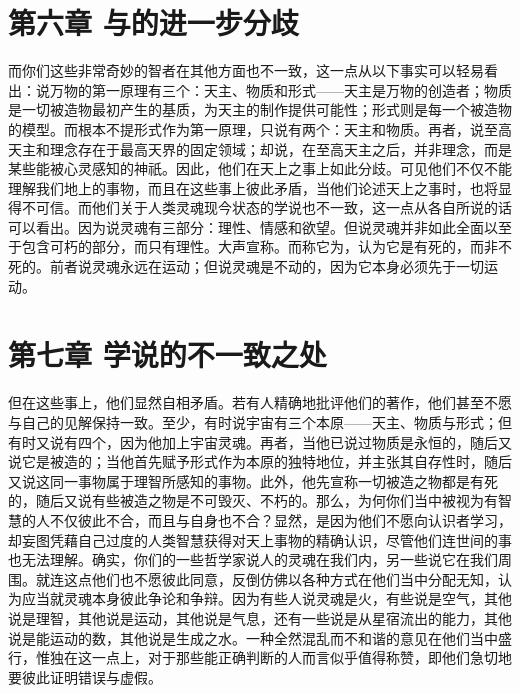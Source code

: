 
\section{第六章 与的进一步分歧}

而你们这些非常奇妙的智者在其他方面也不一致，这一点从以下事实可以轻易看出：说万物的第一原理有三个：天主、物质和形式——天主是万物的创造者；物质是一切被造物最初产生的基质，为天主的制作提供可能性；形式则是每一个被造物的模型。而根本不提形式作为第一原理，只说有两个：天主和物质。再者，说至高天主和理念存在于最高天界的固定领域；却说，在至高天主之后，并非理念，而是某些能被心灵感知的神祇。因此，他们在天上之事上如此分歧。可见他们不仅不能理解我们地上的事物，而且在这些事上彼此矛盾，当他们论述天上之事时，也将显得不可信。而他们关于人类灵魂现今状态的学说也不一致，这一点从各自所说的话可以看出。因为说灵魂有三部分：理性、情感和欲望。但说灵魂并非如此全面以至于包含可朽的部分，而只有理性。大声宣称。而称它为，认为它是有死的，而非不死的。前者说灵魂永远在运动；但说灵魂是不动的，因为它本身必须先于一切运动。\par


\section{第七章 学说的不一致之处}

但在这些事上，他们显然自相矛盾。若有人精确地批评他们的著作，他们甚至不愿与自己的见解保持一致。至少，有时说宇宙有三个本原——天主、物质与形式；但有时又说有四个，因为他加上宇宙灵魂。再者，当他已说过物质是永恒的，随后又说它是被造的；当他首先赋予形式作为本原的独特地位，并主张其自存性时，随后又说这同一事物属于理智所感知的事物。此外，他先宣称一切被造之物都是有死的，随后又说有些被造之物是不可毁灭、不朽的。那么，为何你们当中被视为有智慧的人不仅彼此不合，而且与自身也不合？显然，是因为他们不愿向认识者学习，却妄图凭藉自己过度的人类智慧获得对天上事物的精确认识，尽管他们连世间的事也无法理解。确实，你们的一些哲学家说人的灵魂在我们内，另一些说它在我们周围。就连这点他们也不愿彼此同意，反倒仿佛以各种方式在他们当中分配无知，认为应当就灵魂本身彼此争论和争辩。因为有些人说灵魂是火，有些说是空气，其他说是理智，其他说是运动，其他说是气息，还有一些说是从星宿流出的能力，其他说是能运动的数，其他说是生成之水。一种全然混乱而不和谐的意见在他们当中盛行，惟独在这一点上，对于那些能正确判断的人而言似乎值得称赞，即他们急切地要彼此证明错误与虚假。\par

